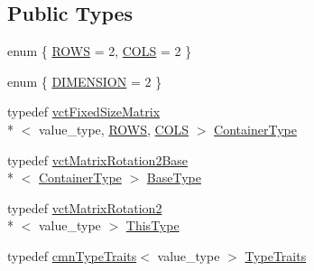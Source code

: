 \subsection*{Public Types}
\begin{DoxyCompactItemize}
\item 
enum \{ \hyperlink{classvct_matrix_rotation2_ac2875a62bcfe1fb310808a4aff444120a405943de2af4c1dae37a90156248a41b}{R\-O\-W\-S} = 2, 
\hyperlink{classvct_matrix_rotation2_ac2875a62bcfe1fb310808a4aff444120a3f895b9e3be292e80920a74194301b11}{C\-O\-L\-S} = 2
 \}
\item 
enum \{ \hyperlink{classvct_matrix_rotation2_adb5878f342cf4be98c9e6d79e9ae359ba3641e8aa72f502ddb4dc582365767927}{D\-I\-M\-E\-N\-S\-I\-O\-N} = 2
 \}
\item 
typedef \hyperlink{classvct_fixed_size_matrix}{vct\-Fixed\-Size\-Matrix}\\*
$<$ value\-\_\-type, \hyperlink{classvct_matrix_rotation2_ac2875a62bcfe1fb310808a4aff444120a405943de2af4c1dae37a90156248a41b}{R\-O\-W\-S}, \hyperlink{classvct_matrix_rotation2_ac2875a62bcfe1fb310808a4aff444120a3f895b9e3be292e80920a74194301b11}{C\-O\-L\-S} $>$ \hyperlink{classvct_matrix_rotation2_ab84e040499a56ef9c8ab6b3a57e09479}{Container\-Type}
\item 
typedef \hyperlink{classvct_matrix_rotation2_base}{vct\-Matrix\-Rotation2\-Base}\\*
$<$ \hyperlink{classvct_matrix_rotation2_ab84e040499a56ef9c8ab6b3a57e09479}{Container\-Type} $>$ \hyperlink{classvct_matrix_rotation2_a6d9fad3de3e445606a22bf1a3e9da631}{Base\-Type}
\item 
typedef \hyperlink{classvct_matrix_rotation2}{vct\-Matrix\-Rotation2}\\*
$<$ value\-\_\-type $>$ \hyperlink{classvct_matrix_rotation2_a5129223265a26c20222068fee4733dd1}{This\-Type}
\item 
typedef \hyperlink{classcmn_type_traits}{cmn\-Type\-Traits}$<$ value\-\_\-type $>$ \hyperlink{classvct_matrix_rotation2_aaa741677f3a705c18adc25e022a5fa5c}{Type\-Traits}
\end{DoxyCompactItemize}
